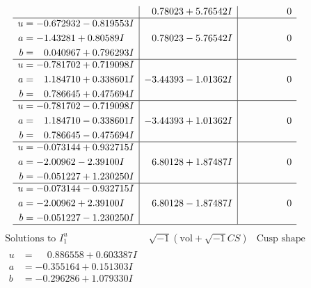 \documentclass[1p]{elsarticle_modified}
\theoremstyle{definition}
\newcommand{\I}{\sqrt{-1}}
\begin{document}
$$\begin{array}{c|c|c}
 & \phantom{-}0.78023 + 5.76542 I & \phantom{-0.000000 } 0 \\ \hline\begin{aligned}
u &= -0.672932 - 0.819553 I \\
a &= -1.43281 + 0.80589 I \\
b &= \phantom{-}0.040967 + 0.796293 I\end{aligned}
 & \phantom{-}0.78023 - 5.76542 I & \phantom{-0.000000 } 0 \\ \hline\begin{aligned}
u &= -0.781702 + 0.719098 I \\
a &= \phantom{-}1.184710 + 0.338601 I \\
b &= \phantom{-}0.786645 + 0.475694 I\end{aligned}
 & -3.44393 - 1.01362 I & \phantom{-0.000000 } 0 \\ \hline\begin{aligned}
u &= -0.781702 - 0.719098 I \\
a &= \phantom{-}1.184710 - 0.338601 I \\
b &= \phantom{-}0.786645 - 0.475694 I\end{aligned}
 & -3.44393 + 1.01362 I & \phantom{-0.000000 } 0 \\ \hline\begin{aligned}
u &= -0.073144 + 0.932715 I \\
a &= -2.00962 - 2.39100 I \\
b &= -0.051227 + 1.230250 I\end{aligned}
 & \phantom{-}6.80128 + 1.87487 I & \phantom{-0.000000 } 0 \\ \hline\begin{aligned}
u &= -0.073144 - 0.932715 I \\
a &= -2.00962 + 2.39100 I \\
b &= -0.051227 - 1.230250 I\end{aligned}
 & \phantom{-}6.80128 - 1.87487 I & \phantom{-0.000000 } 0\\
 \hline 
 \end{array}$$\newpage$$\begin{array}{c|c|c}  
\text{Solutions to }I^u_{1}& \I (\text{vol} + \sqrt{-1}CS) & \text{Cusp shape}\\
 \hline 
\begin{aligned}
u &= \phantom{-}0.886558 + 0.603387 I \\
a &= -0.355164 + 0.151303 I \\
b &= -0.296286 + 1.079330 I\end{aligned}

\end{array}$$
\end{document}
